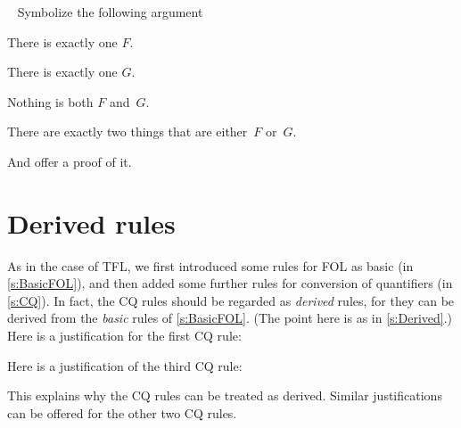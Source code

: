 \
\problempart
Symbolize the following argument
	\begin{earg}
		\item There is exactly one $F$. 
		\item There is exactly one $G$. 
		\item Nothing is both $F$ and~$G$. 
		\item[\texttherefore] There are exactly two things that are either~$F$ or~$G$.
	\end{earg}
And offer a proof of it.




\chapter{Derived rules}\label{s:DerivedFOL}
As in the case of TFL, we first introduced some rules for FOL as basic (in \cref{s:BasicFOL}), and then added some further rules for conversion of quantifiers (in \cref{s:CQ}). In fact, the CQ rules should be regarded as \emph{derived} rules, for they can be derived from the  \emph{basic} rules of \cref{s:BasicFOL}. (The point here is as in \cref{s:Derived}.) Here is a justification for the first CQ rule:
\begin{fitchproof}
	\open
		\AS
		\open
			\AS
		\close
	\close
\end{fitchproof}
Here is a justification of the third CQ rule:
\begin{fitchproof}
	\PR
	\open
		\AS
		\open
			\AS
		\close
	\close
\end{fitchproof}
This explains why the CQ rules can be treated as derived. Similar justifications can be offered for the other two CQ rules.


